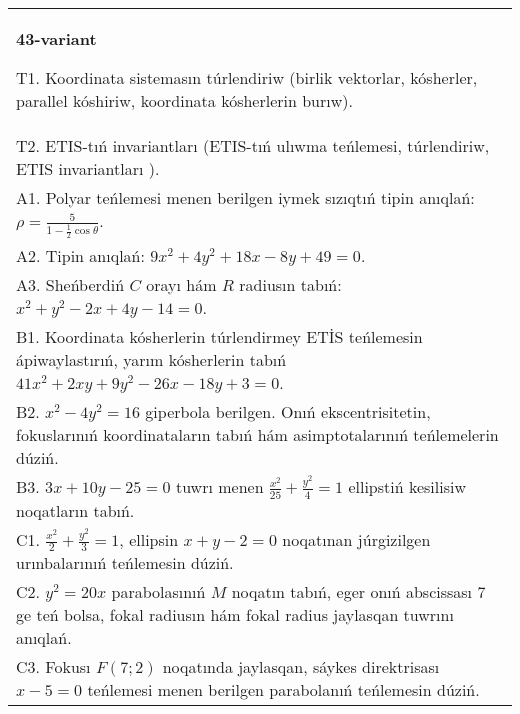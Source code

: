 \documentclass{article}
\begin{document}
\begin{tabular}{m{17cm}}
\textbf{43-variant}
\newline

T1. Koordinata sistemasın túrlendiriw (birlik vektorlar, kósherler, parallel kóshiriw, koordinata kósherlerin burıw).\\

T2. ETIS-tıń invariantları (ETIS-tıń ulıwma teńlemesi, túrlendiriw, ETIS invariantları ).\\

A1. Polyar teńlemesi menen berilgen iymek sızıqtıń tipin anıqlań: $\rho=\frac{5}{1-\frac{1}{2}\cos\theta}$.\\

A2. Tipin anıqlań: $9 x^{2}+4 y^{2}+18 x-8 y+49=0$.\\

A3. Sheńberdiń $C$ orayı hám $R$ radiusın tabıń: $x^2+y^2-2 x+4 y-14=0$.\\

B1. Koordinata kósherlerin túrlendirmey ETİS teńlemesin ápiwaylastırıń, yarım kósherlerin tabıń $41x^{2} + 2xy + 9y^{2} - 26x - 18y + 3 = 0$.  \\

B2. $x^{2} - 4y^{2} = 16$ giperbola berilgen. Onıń ekscentrisitetin, fokuslarınıń koordinataların tabıń hám asimptotalarınıń teńlemelerin dúziń.\\

B3. $3x + 10y - 25 = 0$ tuwrı menen $\frac{x^{2}}{25} + \frac{y^{2}}{4} = 1$ ellipstiń kesilisiw noqatların tabıń.\\

C1. $\frac{x^{2}}{2} + \frac{y^{2}}{3} = 1$, ellipsin $x + y - 2 = 0$ noqatınan júrgizilgen urınbalarınıń teńlemesin dúziń.  \\

C2. $y^{2} = 20x$ parabolasınıń $M$ noqatın tabıń, eger onıń abscissası 7 ge teń bolsa, fokal radiusın hám fokal radius jaylasqan tuwrını anıqlań.\\

C3. Fokusı $F(7;2)$ noqatında jaylasqan, sáykes direktrisası $x - 5 = 0$ teńlemesi menen berilgen parabolanıń teńlemesin dúziń.  \\

\end{tabular}
\vspace{1cm}
\end{document}
